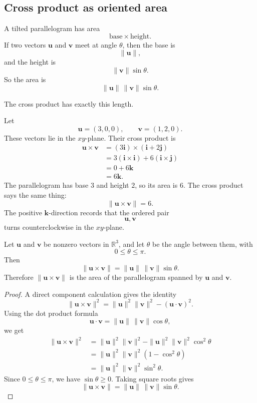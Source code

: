 \subsection{Cross product as oriented area}

A tilted parallelogram has area
\[
    \text{base}\times\text{height}.
\]
If two vectors \(\mathbf u\) and \(\mathbf v\) meet at angle \(\theta\), then the base is
\[
    \|\mathbf u\|,
\]
and the height is
\[
    \|\mathbf v\|\sin\theta.
\]
So the area is
\[
    \|\mathbf u\|\,\|\mathbf v\|\sin\theta.
\]

The cross product has exactly this length.

\begin{example}
Let
\[
    \mathbf u=(3,0,0),
    \qquad
    \mathbf v=(1,2,0).
\]
These vectors lie in the \(xy\)-plane.  Their cross product is
\[
\begin{aligned}
\mathbf u\times\mathbf v
&=
(3\mathbf i)\times(\mathbf i+2\mathbf j)\\
&=
3(\mathbf i\times\mathbf i)+6(\mathbf i\times\mathbf j)\\
&=
0+6\mathbf k\\
&=
6\mathbf k.
\end{aligned}
\]
The parallelogram has base \(3\) and height \(2\), so its area is \(6\).  The cross
product says the same thing:
\[
    \|\mathbf u\times\mathbf v\|=6.
\]
The positive \(\mathbf k\)-direction records that the ordered pair
\[
    \mathbf u,\mathbf v
\]
turns counterclockwise in the \(xy\)-plane.
\end{example}

\begin{theorem}
Let \(\mathbf u\) and \(\mathbf v\) be nonzero vectors in \(\mathbb R^3\), and let
\(\theta\) be the angle between them, with
\[
    0\leq \theta\leq \pi.
\]
Then
\[
\boxed{
    \|\mathbf u\times\mathbf v\|
    =
    \|\mathbf u\|\,\|\mathbf v\|\sin\theta.
}
\]
Therefore \(\|\mathbf u\times\mathbf v\|\) is the area of the parallelogram spanned by
\(\mathbf u\) and \(\mathbf v\).
\end{theorem}

\begin{proof}
A direct component calculation gives the identity
\[
    \|\mathbf u\times\mathbf v\|^2
    =
    \|\mathbf u\|^2\|\mathbf v\|^2-(\mathbf u\cdot\mathbf v)^2.
\]
Using the dot product formula
\[
    \mathbf u\cdot\mathbf v
    =
    \|\mathbf u\|\,\|\mathbf v\|\cos\theta,
\]
we get
\[
\begin{aligned}
\|\mathbf u\times\mathbf v\|^2
&=
\|\mathbf u\|^2\|\mathbf v\|^2
-
\|\mathbf u\|^2\|\mathbf v\|^2\cos^2\theta\\
&=
\|\mathbf u\|^2\|\mathbf v\|^2(1-\cos^2\theta)\\
&=
\|\mathbf u\|^2\|\mathbf v\|^2\sin^2\theta.
\end{aligned}
\]
Since \(0\leq \theta\leq \pi\), we have \(\sin\theta\geq0\).  Taking square roots gives
\[
    \|\mathbf u\times\mathbf v\|
    =
    \|\mathbf u\|\,\|\mathbf v\|\sin\theta.
\]
\end{proof}

